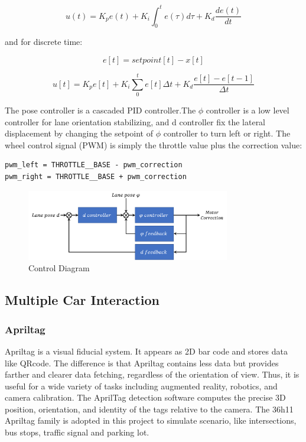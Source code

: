 \documentclass[conference]{IEEEtran}
\begin{document}
\[u(t) = K_p e(t) + K_i \int_{0}^{t} e(\tau) d\tau + K_d  \frac{de(t)}{dt}\]

and for discrete time:

\[e[t] = setpoint[t] - x[t]\]

\[u[t] = K_p e[t] + K_i \sum_0^t e[t] \Delta t + K_d \frac{e[t] - e[t-1]}{\Delta t}\]

	The pose controller is a cascaded PID controller.The $\phi$ controller is a low level controller for lane orientation stabilizing, and d controller fix the lateral displacement by changing the setpoint of $\phi$ controller to turn left or right.
The wheel control signal (PWM) is simply the throttle value plus the correction value:

\begin{lstlisting}
pwm_left = THROTTLE__BASE - pwm_correction
pwm_right = THROTTLE__BASE + pwm_correction
\end{lstlisting}

\FloatBarrier
\begin{figure}	
	\centering
	\includegraphics[width=3.5in]{img/controller.png}
	\caption{Control Diagram}
	\label{fig:controller}
\end{figure}

\subsection{Multiple Car Interaction}

\subsubsection{Apriltag}

Apriltag is a visual fiducial system. It appears as 2D bar code and stores data like QRcode. The difference is that Apriltag contains less data but provides farther and clearer data fetching, regardless of the orientation of view. Thus, it is useful for a wide variety of tasks including augmented reality, robotics, and camera calibration. The AprilTag detection software computes the precise 3D position, orientation, and identity of the tags relative to the camera. The 36h11 Apriltag family is adopted in this project to simulate scenario, like intersections, bus stops, traffic signal and parking lot.
\end{document}
